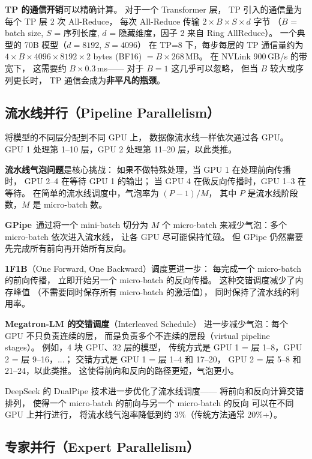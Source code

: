 \textbf{TP 的通信开销}可以精确计算。
对于一个 Transformer 层，
TP 引入的通信量为每个 TP 层 2 次 All-Reduce，
每次 All-Reduce 传输 $2 \times B \times S \times d$ 字节
（$B$ = batch size, $S$ = 序列长度, $d$ = 隐藏维度，因子 2 来自 Ring AllReduce）。
一个典型的 70B 模型（$d = 8192$, $S = 4096$）
在 TP=8 下，每步每层的 TP 通信量约为
$4 \times B \times 4096 \times 8192 \times 2$ bytes (BF16)
$= B \times 268$\,MB。
在 NVLink 900\,GB/s 的带宽下，
这需要约 $B \times 0.3$\,ms——
对于 $B = 1$ 这几乎可以忽略，
但当 $B$ 较大或序列更长时，
TP 通信会成为\textbf{非平凡的瓶颈}。

\subsection{流水线并行（Pipeline Parallelism）}

将模型的不同层分配到不同 GPU 上，
数据像流水线一样依次通过各 GPU。
GPU 1 处理第 1--10 层，GPU 2 处理第 11--20 层，以此类推。

\textbf{流水线气泡问题}是核心挑战：
如果不做特殊处理，当 GPU 1 在处理前向传播时，
GPU 2--4 在等待 GPU 1 的输出；
当 GPU 4 在做反向传播时，GPU 1--3 在等待。
在简单的流水线调度中，气泡率为 $(P-1)/M$，
其中 $P$ 是流水线阶段数，$M$ 是 micro-batch 数。

\textbf{GPipe}~通过将一个 mini-batch 切分为 $M$ 个 micro-batch
来减少气泡：多个 micro-batch 依次进入流水线，
让各 GPU 尽可能保持忙碌。
但 GPipe 仍然需要先完成所有前向再开始所有反向。%

\textbf{1F1B}（One Forward, One Backward）调度更进一步：
每完成一个 micro-batch 的前向传播，
立即开始另一个 micro-batch 的反向传播。
这种交错调度减少了内存峰值
（不需要同时保存所有 micro-batch 的激活值），
同时保持了流水线的利用率。

\textbf{Megatron-LM 的交错调度}（Interleaved Schedule）
进一步减少气泡：每个 GPU 不只负责连续的层，
而是负责多个不连续的层段（virtual pipeline stages）。
例如，4 块 GPU、32 层的模型，
传统方式是 GPU 1 = 层 1--8，GPU 2 = 层 9--16，...；
交错方式是 GPU 1 = 层 1--4 和 17--20，
GPU 2 = 层 5--8 和 21--24，以此类推。
这使得前向和反向的路径更短，气泡更小。

DeepSeek 的 DualPipe 技术进一步优化了流水线调度——
将前向和反向计算交错排列，
使得一个 micro-batch 的前向与另一个 micro-batch 的反向
可以在不同 GPU 上并行进行，
将流水线气泡率降低到约 3\%（传统方法通常 20\%+）。

\subsection{专家并行（Expert Parallelism）}

